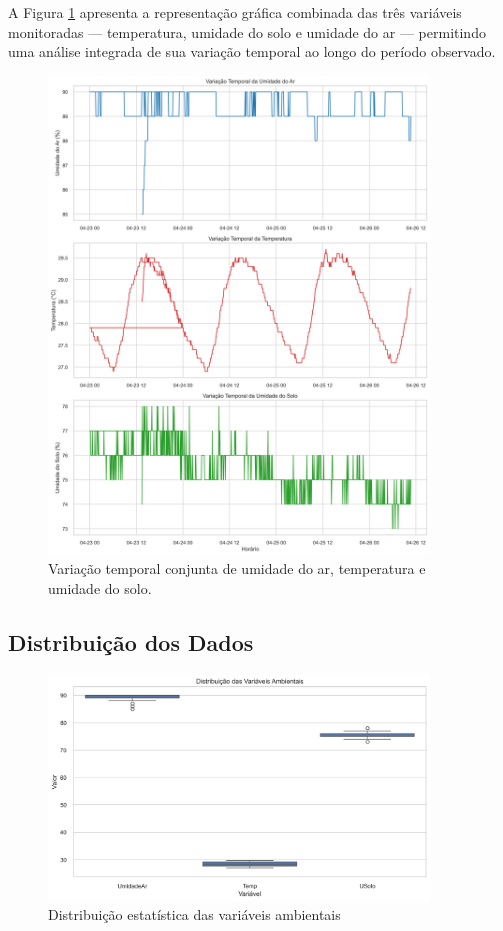 \documentclass[12pt, a4paper]{article}
\begin{document}
A Figura \ref{fig:temporal_combinado} apresenta a representação gráfica combinada das três variáveis monitoradas — temperatura, umidade do solo e umidade do ar — permitindo uma análise integrada de sua variação temporal ao longo do período observado.

\begin{figure}[H]
\centering
\includegraphics[width=0.9\textwidth]{graficos/temporal_combinado.png}
\caption{Variação temporal conjunta de umidade do ar, temperatura e umidade do solo.}
\label{fig:temporal_combinado}
\end{figure}

\subsection{Distribuição dos Dados}
\begin{figure}[H]
\centering
\includegraphics[width=0.9\textwidth]{graficos/boxplot_variaveis.png}
\caption{Distribuição estatística das variáveis ambientais}
\label{fig:boxplot}
\end{figure}
\end{document}

